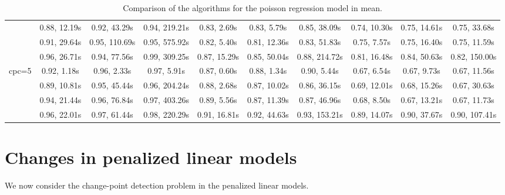 \documentclass[article]{jss}\usepackage[]{graphicx}\usepackage[]{xcolor}
\begin{document}
\begin{landscape}
\begin{table}[t!]
\begin{tabular}{@{}cccccccccc@{}}
                           & 0.88, 12.19s & 0.92, 43.29s & 0.94, 219.21s & 0.83, 2.69s & 0.83, 5.79s & 0.85, 38.09s & 0.74, 10.30s & 0.75, 14.61s & 0.75, 33.68s \\
                           & 0.91, 29.64s & 0.95, 110.69s & 0.95, 575.92s & 0.82, 5.40s & 0.81, 12.36s & 0.83, 51.83s & 0.75, 7.57s & 0.75, 16.40s & 0.75, 11.59s \\
                           & 0.96, 26.71s & 0.94, 77.56s & 0.99, 309.25s & 0.87, 15.29s & 0.85, 50.04s & 0.88, 214.72s & 0.81, 16.48s & 0.84, 50.63s & 0.82, 150.00s \\ \midrule
    \multirow{4}{*}{cpc=5} & 0.92, 1.18s & 0.96, 2.33s & 0.97, 5.91s & 0.87, 0.60s & 0.88, 1.34s & 0.90, 5.44s & 0.67, 6.54s & 0.67, 9.73s & 0.67, 11.56s \\
                           & 0.89, 10.81s & 0.95, 45.44s & 0.96, 204.24s & 0.88, 2.68s & 0.87, 10.02s & 0.86, 36.15s & 0.69, 12.01s & 0.68, 15.26s & 0.67, 30.63s \\
                           & 0.94, 21.44s & 0.96, 76.84s & 0.97, 403.26s & 0.89, 5.56s & 0.87, 11.39s & 0.87, 46.96s & 0.68, 8.50s & 0.67, 13.21s & 0.67, 11.73s \\
                           & 0.96, 22.01s & 0.97, 61.44s & 0.98, 220.29s & 0.91, 16.81s & 0.92, 44.63s & 0.93, 153.21s & 0.89, 14.07s & 0.90, 37.67s & 0.90, 107.41s \\ \bottomrule
    \end{tabular}
    \caption{\label{tab:poisson regression comparison} Comparison of the algorithms for the poisson regression model in mean.}
  \end{table}

\end{landscape}
\restoregeometry

\section{Changes in penalized linear models} \label{sec:penalized linear model}

We now consider the change-point detection problem in the penalized linear
models.
%

%
\end{document}
